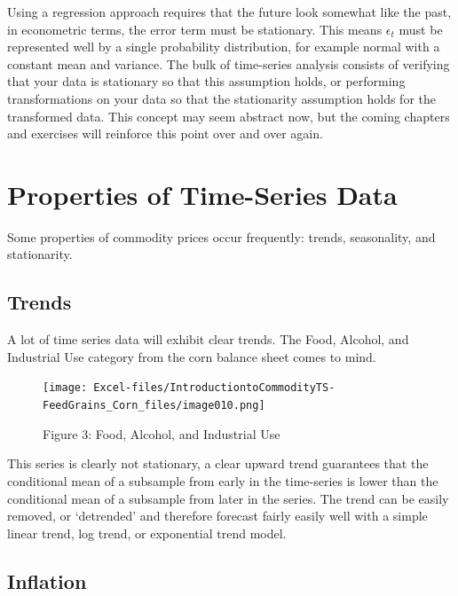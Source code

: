 \documentclass[
  letterpaper,
  DIV=11,
  numbers=noendperiod]{scrreprt}
\begin{document}
Using a regression approach requires that the future look somewhat like
the past, in econometric terms, the error term must be stationary. This
means \(\epsilon_t\) must be represented well by a single probability
distribution, for example normal with a constant mean and variance. The
bulk of time-series analysis consists of verifying that your data is
stationary so that this assumption holds, or performing transformations
on your data so that the stationarity assumption holds for the
transformed data. This concept may seem abstract now, but the coming
chapters and exercises will reinforce this point over and over again.

\hypertarget{properties-of-time-series-data}{%
\section{Properties of Time-Series
Data}\label{properties-of-time-series-data}}

Some properties of commodity prices occur frequently: trends,
seasonality, and stationarity.

\hypertarget{trends}{%
\subsection{Trends}\label{trends}}

A lot of time series data will exhibit clear trends. The Food, Alcohol,
and Industrial Use category from the corn balance sheet comes to mind.

\begin{figure}

{\centering \texttt{[image: Excel-files/IntroductiontoCommodityTS-FeedGrains\_Corn\_files/image010.png]}

}

\caption{Figure 3: Food, Alcohol, and Industrial Use}

\end{figure}

This series is clearly not stationary, a clear upward trend guarantees
that the conditional mean of a subsample from early in the time-series
is lower than the conditional mean of a subsample from later in the
series. The trend can be easily removed, or `detrended' and therefore
forecast fairly easily well with a simple linear trend, log trend, or
exponential trend model.

\hypertarget{inflation}{%
\subsection{Inflation}\label{inflation}}
\end{document}
